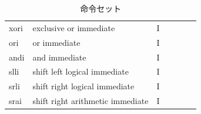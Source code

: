 \documentclass[../main.tex]{subfiles}
\begin{document}
\begin{table}[h]
\begin{tabular}{|l|l|l|llll}
    xori  & exclusive or immediate                & I  &                       &                             &                                                    &                         \\
    ori   & or immediate                          & I  &                       &                             &                                                    &                         \\
    andi  & and immediate                         & I  &                       &                             &                                                    &                         \\
    slli  & shift left logical immediate          & I  &                       &                             &                                                    &                         \\
    srli  & shift right logical immediate         & I  &                       &                             &                                                    &                         \\
    srai  & shift right arithmetic immediate      & I  &                       &                             &                                                    &                         \\ \cline{1-3}
    \end{tabular}
    \caption{命令セット}
    \label{table:isa}
  \end{table}  

  \clearpage
\end{document}
